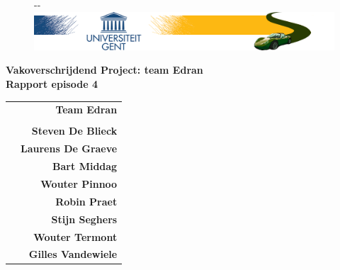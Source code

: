 \documentclass[11pt,a4paper,oneside]{article}
\begin{document}
\begin{titlepage}

\thispagestyle{fancy}
\fancyhf{}
\fancyfoot[L]{}
\begin{figure}[!ht]
  \begin{adjustwidth}{-\oddsidemargin-1in}{-\rightmargin}
    \centering
    \includegraphics[width=\paperwidth]{banner}
  \end{adjustwidth}
\end{figure}
\vspace{-0.2em}
\begin{center}
\vspace{5cm}
\Huge \textbf{Vakoverschrijdend Project: team Edran\\ Rapport episode 4}\\
\vspace{6.0cm}
\large
\begin{tabular}{L! {} R}
& {\LARGE\bf Team Edran} \\
& \\
& {\bf Steven De Blieck} \\
& {\bf Laurens De Graeve} \\
& {\bf Bart Middag} \\
& {\bf Wouter Pinnoo} \\
& {\bf Robin Praet} \\
& {\bf Stijn Seghers} \\
& {\bf Wouter Termont} \\
& {\bf Gilles Vandewiele} \\
\end{tabular}
\end{center}
\end{titlepage}
\newpage

\fancyheadoffset[RO,LE]{0in}

\fancyfoot[L]{}
\fancyfoot[C]{\thepage}
\pagestyle{fancy}
\tableofcontents
\newpage

\setcounter{section}{0}
\setcounter{subsection}{0}
\end{document}
